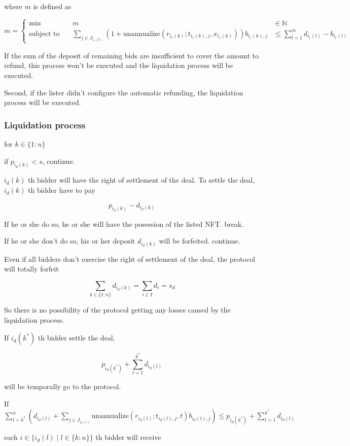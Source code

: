 \documentclass[dvipdfmx]{jsarticle}
\begin{document}
where $m$ is defined as

$$
  m = \left\{\begin{aligned}
    \min && \ m & \in \mathbb{N} \\
    \text{subject to} && \ \sum_{j \in J_{i_r(k)}} (1 + \text{unannualize}(r_{i_r(k)}; t_{i_r(k),j}, x_{i_r(k)})) b_{i_r(k),j} & \le \sum_{l=1}^m {d_{i_r(l)} - b_{i_r(l)}}
  \end{aligned}\right.
$$

If the sum of the deposit of remaining bids are insufficient to cover the amount to refund, this process won't be executed and the liquidation process will be executed.

Second, if the lister didn't configure the automatic refunding, the liquidation process will be executed.

\subsubsection{Liquidation process}

for $k \in \{1:n\}$

if $p_{i_d(k)} < s$, continue.

$i_d(k)$ th bidder will have the right of settlement of the deal.
To settle the deal, $i_d(k)$ th bidder have to pay

$$
  p_{i_d(k)} - d_{i_d(k)}
$$

If he or she do so, he or she will have the posession of the listed NFT. break.

If he or she don't do so, his or her deposit $d_{i_d(k)}$ will be forfeited. continue.

Even if all bidders don't exercise the right of settlement of the deal,
the protocol will totally forfeit 

$$
  \sum_{k \in \{1:n\}} d_{i_d(k)} = \sum_{i \in I} d_i = s_d
$$

So there is no possibility of the protocol getting any losses caused by the liquidation process.

If $i_d(k^*)$ th bidder settle the deal,

$$
  p_{i_d(k^*)} + \sum_{l=1}^{k^*} d_{i_d(l)}
$$

will be temporally go to the protocol.

If $\sum_{l=k^*}^n \left(d_{i_d(l)} + \sum_{j \in J_{i_d(l)}} \text{unannualize}(r_{i_d(l)}; t_{i_d(l),j}, t) b_{i_d(l),j} \right) \le p_{i_d(k^*)} + \sum_{l=1}^{k^*} d_{i_d(l)}$

each $i \in \{i_d(l) \mid l \in \{k:n\}\}$ th bidder will receive
\end{document}
